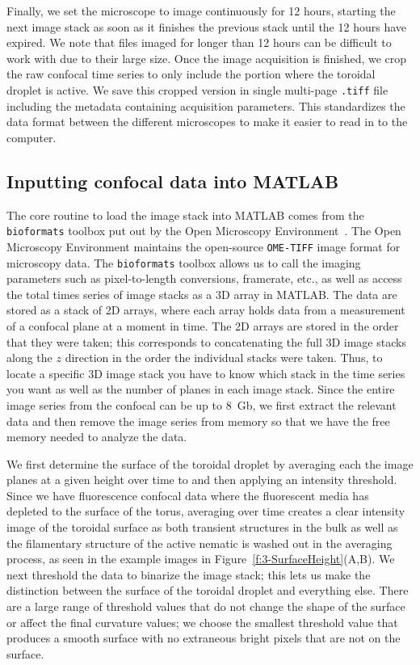 Finally, we set the microscope to image continuously for 12 hours, starting the next image stack as soon as it finishes the previous stack until the 12 hours have expired.
We note that files imaged for longer than 12 hours can be difficult to work with due to their large size.
Once the image acquisition is finished, we crop the raw confocal time series to only include the portion where the toroidal droplet is active.
We save this cropped version in single multi-page \texttt{.tiff} file including the metadata containing acquisition parameters.
This standardizes the data format between the different microscopes to make it easier to read in to the computer.


\subsection{Inputting confocal data into MATLAB}
The core routine to load the image stack into MATLAB comes from the \texttt{bioformats} toolbox put out by the Open Microscopy Environment~\cite{RN265}.
The Open Microscopy Environment maintains the open-source \texttt{OME-TIFF} image format for microscopy data.
The \texttt{bioformats} toolbox allows us to call the imaging parameters such as pixel-to-length conversions, framerate, etc., as well as access the total times series of image stacks as a 3D array in MATLAB.
The data are stored as a stack of 2D arrays, where each array holds data from a measurement of a confocal plane at a moment in time.
The 2D arrays are stored in the order that they were taken; this corresponds to concatenating the full 3D image stacks along the $z$ direction in the order the individual stacks were taken.
Thus, to locate a specific 3D image stack you have to know which stack in the time series you want as well as the number of planes in each image stack.
Since the entire image series from the confocal can be up to 8~Gb, we first extract the relevant data and then remove the image series from memory so that we have the free memory needed to analyze the data.

We first determine the surface of the toroidal droplet by averaging each the image planes at a given height over time to and then applying an intensity threshold.
Since we have fluorescence confocal data where the fluorescent media has depleted to the surface of the torus, averaging over time creates a clear intensity image of the toroidal surface as both transient structures in the bulk as well as the filamentary structure of the active nematic is washed out in the averaging process, as seen in the example images in Figure~\ref{f:3-SurfaceHeight}(A,B).
We next threshold the data to binarize the image stack; this lets us make the distinction between the surface of the toroidal droplet and everything else.
There are a large range of threshold values that do not change the shape of the surface or affect the final curvature values; we choose the smallest threshold value that produces a smooth surface with no extraneous bright pixels that are not on the surface.

